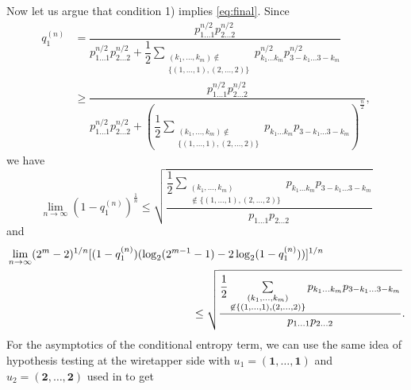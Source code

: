Now let us argue that condition 1) implies \eqref{eq:final}. Since 
\begin{align*}
 q^{(n)}_1&= \dfrac{p_{1\ldots 1}^{n/2}p_{2\ldots 2}^{n/2}}{p_{1\ldots 1}^{n/2}p_{2\ldots 2}^{n/2}+\dfrac{1}{2}\sum \limits_{\substack{(k_1,\ldots,k_m) \not\in\\  \{(1,\ldots,1),(2,\ldots,2)\}}}p_{k_1\ldots k_m}^{n/2}p_{3-k_1\ldots 3-k_m}^{n/2}}\\ &\geq \dfrac{p_{1\ldots 1}^{n/2}p_{2\ldots 2}^{n/2}}{p_{1\ldots 1}^{n/2}p_{2\ldots 2}^{n/2}+\left(\dfrac{1}{2} \sum \limits_{\substack{(k_1,\ldots,k_m)\not\in \\  \{(1,\ldots,1),(2,\ldots,2)\}}}p_{k_1\ldots k_m}p_{3-k_1\ldots 3-k_m}\right)^{\frac{n}{2}}},
\end{align*}
 we have
$$\lim \limits_{n \to \infty}(1-q^{(n)}_1)^{\frac{1}{n}} \leq \sqrt{\dfrac{\dfrac{1}{2} \sum \limits_{\substack{(k_1,\ldots,k_m)\\ \not\in \{(1,\ldots,1),(2,\ldots,2)\}}}p_{k_1\ldots k_m}p_{3-k_1\ldots 3-k_m}}{p_{1\ldots 1}p_{2\ldots 2}}} $$
and 
\begin{align}\label{eq:left_limit}
   & \lim \limits_{n \to \infty} (2^{m}-2)^{1/n}[(1-q^{(n)}_1)(\log_2 (2^{m-1}-1) - 2\log_2 (1-q^{(n)}_1))]^{1/n} \nonumber \\ &\mkern 300mu\leq \sqrt{\dfrac{\dfrac{1}{2} \sum \limits_{\substack{(k_1,\ldots,k_m)  \\ \not\in \{(1,\ldots,1),(2,\ldots,2)\}}}p_{k_1\ldots k_m}p_{3-k_1\ldots 3-k_m}}{p_{1\ldots 1}p_{2\ldots 2}}}.
\end{align}
For the asymptotics of the conditional entropy term, we can use the same idea of hypothesis testing at the wiretapper side with $u_1=(\mathbf{1}, \ldots, \mathbf{1})$ and $u_2=(\mathbf{2}, \ldots, \mathbf{2})$ used in \cite[Lemma~2]{amin2020} to get
